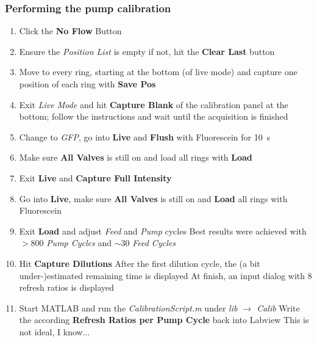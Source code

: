 \documentclass{article}
\newcounter{ListCounter}
\begin{document}
	
	\subsubsection{Performing the pump calibration}
	\begin{enumerate}
		\setcounter{enumi}{\value{ListCounter}}
	\item Click the \textbf{No Flow} Button
	\item Ensure the \textit{Position List} is empty
	\subitem if not, hit the \textbf{Clear Last} button
	\item Move to every ring, starting at the bottom (of live mode) and capture one position of each ring with \textbf{Save Pos} 
	\item Exit \textit{Live Mode} and hit \textbf{Capture Blank} of the calibration panel at the bottom; follow the instructions and wait until the acquisition is finished
	\item Change to \textit{GFP}, go into \textbf{Live} and \textbf{Flush} with Fluorescein for \SI{10}{\second}
	\item Make sure \textbf{All Valves} is still on and load all rings with \textbf{Load}
	\item Exit \textbf{Live} and \textbf{Capture Full Intensity}
	\item Go into \textbf{Live}, make sure \textbf{All Valves} is still on and \textbf{Load} all rings with Fluorescein
	\item Exit \textbf{Load} and adjust \textit{Feed} and \textit{Pump} cycles
	\subitem Best results were achieved with $>$800 \textit{Pump Cycles} and $\sim$30 \textit{Feed Cycles}
	\item Hit \textbf{Capture Dilutions}
	\subitem After the first dilution cycle, the (a bit under-)estimated remaining time is displayed 
	\subitem At finish, an input dialog with 8 refresh ratios is displayed
	\item Start MATLAB and run the \textit{CalibrationScript.m} under \textit{lib $\rightarrow$ Calib}
	\subitem Write the according \textbf{Refresh Ratios per Pump Cycle} back into Labview
	\subitem This is not ideal, I know...	\setcounter{ListCounter}{\value{enumi}}
\end{enumerate}
\end{document}
